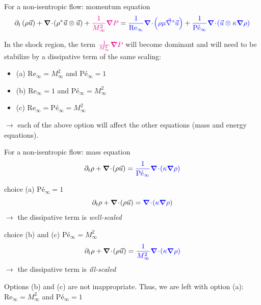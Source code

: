 \documentclass[xcolor=dvipsnames,10pt]{beamer}
\renewcommand{\Re}{\textrm{Re}}
\newcommand{\Pe}{\textrm{P\'e}}
\renewcommand{\div}{\boldsymbol{\nabla}\! \cdot \!}
\newcommand{\grad}{\boldsymbol{\nabla}}
\newcommand{\gradd}[1]{\vec{\nabla}^{#1}}
\begin{document}
\begin{frame}{For a non-isentropic flow: momentum equation}
\begin{align}
\partial_{t} \left( \rho \vec{u} \right) 
+ \div \left( \rho^* \vec{u}\otimes \vec{u} \right) 
+ \textcolor{magenta}{\frac{1}{M_\infty^2}\grad  P}  
= 
\textcolor{blue}{\frac{1}{\Re_\infty} \div \left( \rho \mu \gradd{s} \vec{u} \right)} +
\textcolor{blue}{\frac{1}{\Pe_\infty} \div \left(\vec{u}\otimes \kappa \grad  \rho \right)} \nonumber
\end{align}
\begin{block}{}
In the shock region, the term $\textcolor{magenta}{\frac{1}{M_\infty^2}\grad  P}  $ will become dominant and will need to be stabilize by a dissipative term of the same scaling:
\begin{itemize}
\setlength{\itemsep}{10pt}
\item (a) $\Re_\infty = M_\infty^2$ and $\Pe_\infty = 1$
\item (b) $\Re_\infty = 1$ and $\Pe_\infty = M_\infty^2$
\item (c) $\Re_\infty = \Pe_\infty = M_\infty^2$
\end{itemize}
$\longrightarrow$ each of the above option will affect the other equations (mass and energy equations).
\end{block}
\end{frame}
\begin{frame}{For a non-isentropic flow: mass equation}
\begin{equation}
\partial_{t} \rho+ \div  \left(  \rho \vec{u}  \right) = \textcolor{blue}{\frac{1}{\Pe_\infty} \div  ( \kappa \grad \rho )} \nonumber
\end{equation}
\begin{block}{choice (a) $\Pe_\infty = 1$}
\begin{equation}
\partial_{t} \rho+ \div  \left(  \rho \vec{u}  \right) = \textcolor{blue}{\div  ( \kappa \grad \rho )} \nonumber
\end{equation}
$\to$ the dissipative term is \emph{well-scaled}
\end{block}
\begin{block}{choice (b) and (c) $\Pe_\infty = M_\infty^2$}
\begin{equation}
\partial_{t} \rho+ \div  \left(  \rho \vec{u}  \right) = \textcolor{blue}{\frac{1}{M_\infty^2} \div  ( \kappa \grad \rho )} \nonumber
\end{equation}
$\to$ the dissipative term is \emph{ill-scaled}
\end{block}
Options (b) and (c) are not inappropriate. Thus, we are left with option (a): $\Re_\infty = M_\infty^2$ and $\Pe_\infty = 1$
\end{frame}
\end{document}
